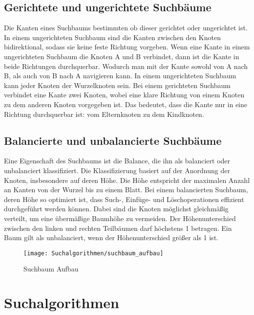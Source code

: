 \subsection{Gerichtete und ungerichtete Suchbäume} \label{gerichtete Graphen}

Die Kanten eines Suchbaums bestimmten ob dieser gerichtet oder ungerichtet ist. In einem ungerichteten Suchbaum sind die Kanten zwischen den Knoten bidirektional, sodass sie keine feste Richtung vorgeben. Wenn eine Kante in einem ungerichteten Suchbaum die Knoten A und B verbindet, dann ist die Kante in beide Richtungen durchquerbar. Wodurch man mit der Kante sowohl von A nach B, als auch von B nach A navigieren kann. In einem ungerichteten Suchbaum kann jeder Knoten der Wurzelknoten sein. Bei einem gerichteten Suchbaum verbindet eine Kante zwei Knoten, wobei eine klare Richtung von einem Knoten zu dem anderen Knoten vorgegeben ist. Das bedeutet, dass die Kante nur in eine Richtung durchquerbar ist: vom Elternknoten zu dem Kindknoten.

\subsection{Balancierte und unbalancierte Suchbäume}

Eine Eigenschaft des Suchbaums ist die Balance, die ihn als balanciert oder unbalanciert klassifiziert. Die Klassifizierung basiert auf der Anordnung der Knoten, insbesondere auf deren Höhe. Die Höhe entspricht der maximalen Anzahl an Kanten von der Wurzel bis zu einem Blatt. Bei einem balancierten Suchbaum, deren Höhe so optimiert ist, dass Such-, Einfüge- und Löschoperationen effizient durchgeführt werden können. Dabei sind die Knoten möglichst gleichmäßig verteilt, um eine übermäßige Baumhöhe zu vermeiden. Der Höhenunterschied zwischen den linken und rechten Teilbäumen darf höchstens 1 betragen. Ein Baum gilt als unbalanciert, wenn der Höhenunterschied größer als 1 ist.

\begin{figure}[h]
  \centering
  \texttt{[image: Suchalgorithmen/suchbaum\_aufbau]}
	\captionsetup{justification=justified, format=plain}
  \caption{Suchbaum Aufbau}
  \label{Suchalgorithmen}
\end{figure}

\section{Suchalgorithmen}

